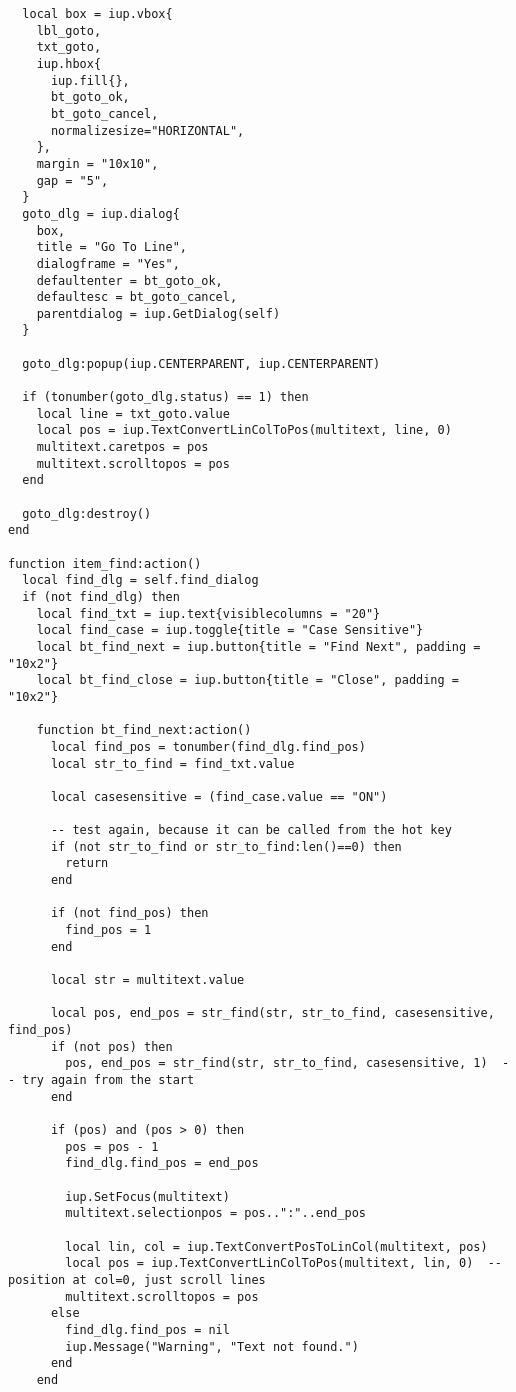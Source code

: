 \documentclass{ctexart}
\begin{document}
\begin{lstlisting}
  local box = iup.vbox{
    lbl_goto,
    txt_goto,
    iup.hbox{
      iup.fill{},
      bt_goto_ok,
      bt_goto_cancel,
      normalizesize="HORIZONTAL", 
    },
    margin = "10x10", 
    gap = "5",
  }
  goto_dlg = iup.dialog{
    box,
    title = "Go To Line", 
    dialogframe = "Yes", 
    defaultenter = bt_goto_ok, 
    defaultesc = bt_goto_cancel,
    parentdialog = iup.GetDialog(self)
  }

  goto_dlg:popup(iup.CENTERPARENT, iup.CENTERPARENT)

  if (tonumber(goto_dlg.status) == 1) then
    local line = txt_goto.value
    local pos = iup.TextConvertLinColToPos(multitext, line, 0)
    multitext.caretpos = pos
    multitext.scrolltopos = pos
  end

  goto_dlg:destroy()
end

function item_find:action()
  local find_dlg = self.find_dialog
  if (not find_dlg) then
    local find_txt = iup.text{visiblecolumns = "20"}
    local find_case = iup.toggle{title = "Case Sensitive"}
    local bt_find_next = iup.button{title = "Find Next", padding = "10x2"}
    local bt_find_close = iup.button{title = "Close", padding = "10x2"}

    function bt_find_next:action()
      local find_pos = tonumber(find_dlg.find_pos)
      local str_to_find = find_txt.value

      local casesensitive = (find_case.value == "ON")

      -- test again, because it can be called from the hot key
      if (not str_to_find or str_to_find:len()==0) then
        return
      end

      if (not find_pos) then
        find_pos = 1
      end

      local str = multitext.value

      local pos, end_pos = str_find(str, str_to_find, casesensitive, find_pos)
      if (not pos) then
        pos, end_pos = str_find(str, str_to_find, casesensitive, 1)  -- try again from the start
      end

      if (pos) and (pos > 0) then
        pos = pos - 1
        find_dlg.find_pos = end_pos

        iup.SetFocus(multitext)
        multitext.selectionpos = pos..":"..end_pos

        local lin, col = iup.TextConvertPosToLinCol(multitext, pos)
        local pos = iup.TextConvertLinColToPos(multitext, lin, 0)  -- position at col=0, just scroll lines
        multitext.scrolltopos = pos
      else
        find_dlg.find_pos = nil
        iup.Message("Warning", "Text not found.")
      end
    end


\end{lstlisting}
\end{document}
